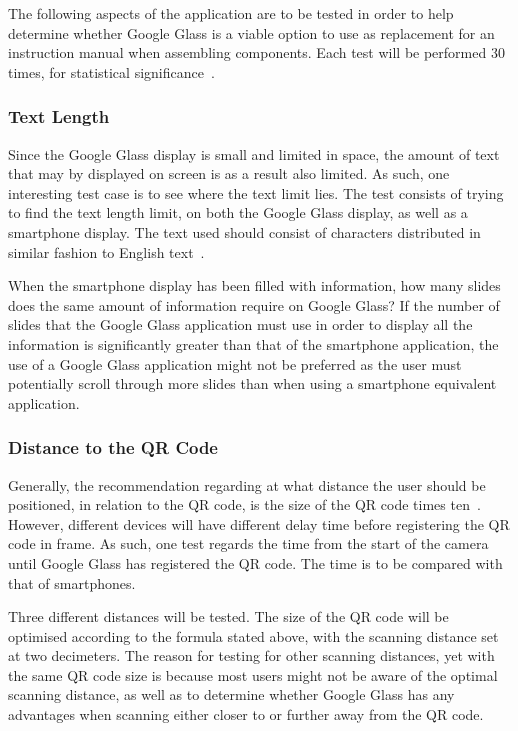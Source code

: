 The following aspects of the application are to be tested in order to help determine whether Google Glass is a viable option to use as replacement for an instruction manual when assembling components. Each test will be performed 30 times, for statistical significance~\cite{30sampleSize}.

\subsubsection{Text Length}
Since the Google Glass display is small and limited in space, the amount of text that may by displayed on screen is as a result also limited. As such, one interesting test case is to see where the text limit lies. The test consists of trying to find the text length limit, on both the Google Glass display, as well as a smartphone display. The text used should consist of characters distributed in similar fashion to English text~\cite{englishTextStat}.

When the smartphone display has been filled with information, how many slides does the same amount of information require on Google Glass? If the number of slides that the Google Glass application must use in order to display all the information is significantly greater than that of the smartphone application, the use of a Google Glass application might not be preferred as the user must potentially scroll through more slides than when using a smartphone equivalent application.



\newpage
\subsubsection{Distance to the QR Code}
Generally, the recommendation regarding at what distance the user should be positioned, in relation to the QR code, is the size of the QR code times ten~\cite{qrCodeSizeComplexity}. However, different devices will have different delay time before registering the QR code in frame. As such, one test regards the time from the start of the camera until Google Glass has registered the QR code. The time is to be compared with that of smartphones.

Three different distances will be tested. The size of the QR code will be optimised according to the formula stated above, with the scanning distance set at two decimeters. The reason for testing for other scanning distances, yet with the same QR code size is because most users might not be aware of the optimal scanning distance, as well as to determine whether Google Glass has any advantages when scanning either closer to or further away from the QR code.

